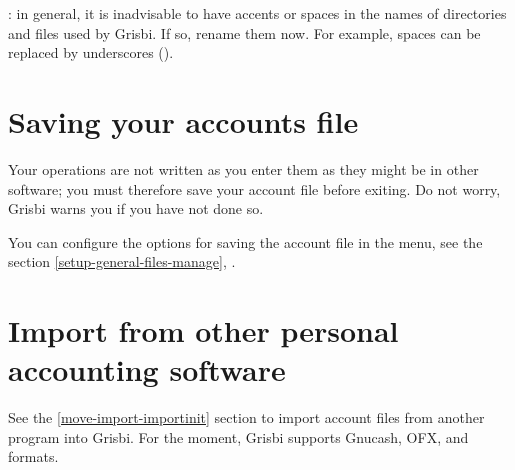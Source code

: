 
\Attention{}: in general, it is inadvisable to have accents or spaces in the names of directories and files used by Grisbi. If so, rename them now. For example, spaces can be replaced by underscores (\underline{}).



\section{Saving your accounts file\label{start-save}}

Your operations are not written as you enter them as they might be in other software; you must therefore save your account file before exiting. Do not worry, Grisbi warns you if you have not done so.

You can configure the options for saving the account file in the  menu, see the section \vref{setup-general-files-manage}, .


\section{Import from other personal accounting software}

See the \vref{move-import-importinit} section to import account files from another program into Grisbi. For the moment, Grisbi supports \gls{Gnucash}, \gls{OFX},  and  formats.
